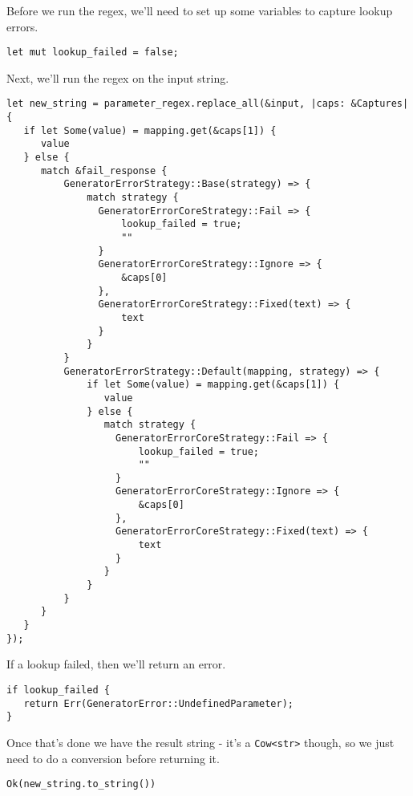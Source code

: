 \documentclass[11pt]{article}
\begin{document}
Before we run the regex, we'll need to set up some variables to capture lookup errors.
\begin{verbatim}
let mut lookup_failed = false;
\end{verbatim}


Next, we'll run the regex on the input string.
\begin{verbatim}
let new_string = parameter_regex.replace_all(&input, |caps: &Captures| {
   if let Some(value) = mapping.get(&caps[1]) {
      value
   } else {
      match &fail_response {
          GeneratorErrorStrategy::Base(strategy) => {
              match strategy {
                GeneratorErrorCoreStrategy::Fail => {
                    lookup_failed = true;
                    ""
                }
                GeneratorErrorCoreStrategy::Ignore => {
                    &caps[0]
                },
                GeneratorErrorCoreStrategy::Fixed(text) => {
                    text
                }
              }
          }
          GeneratorErrorStrategy::Default(mapping, strategy) => {
              if let Some(value) = mapping.get(&caps[1]) {
                 value
              } else {
                 match strategy {
                   GeneratorErrorCoreStrategy::Fail => {
                       lookup_failed = true;
                       ""
                   }
                   GeneratorErrorCoreStrategy::Ignore => {
                       &caps[0]
                   },
                   GeneratorErrorCoreStrategy::Fixed(text) => {
                       text
                   }
                 }  
              }
          }
      }  
   }
});
\end{verbatim}

If a lookup failed, then we'll return an error.
\begin{verbatim}
if lookup_failed {
   return Err(GeneratorError::UndefinedParameter);
}
\end{verbatim}


Once that's done we have the result string - it's a \texttt{Cow<str>} though, so we just need to do a conversion before returning it.
\begin{verbatim}
Ok(new_string.to_string())
\end{verbatim}
\end{document}
